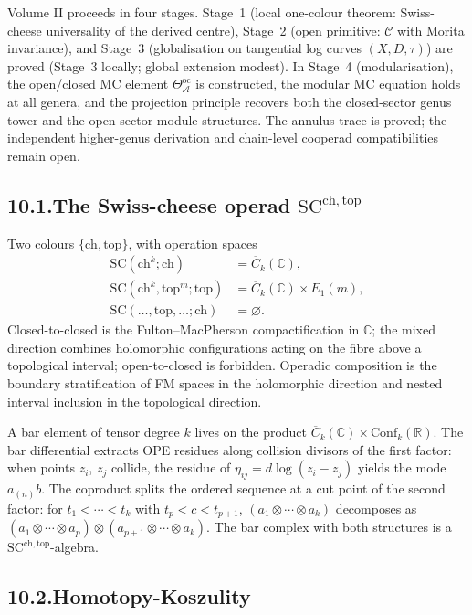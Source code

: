 \documentclass[11pt,reqno]{amsart}
\theoremstyle{definition}
\theoremstyle{remark}
\providecommand{\cA}{\mathcal{A}}
\providecommand{\cC}{\mathcal{C}}
\providecommand{\FM}{\overline{C}}
\providecommand{\bC}{\mathbb{C}}
\providecommand{\bR}{\mathbb{R}}
\providecommand{\SCchtop}{\mathrm{SC}^{\mathrm{ch,top}}}
\providecommand{\Conf}{\mathrm{Conf}}
\providecommand{\oc}{\mathrm{oc}}
\providecommand{\SC}{\mathrm{SC}}
\numberwithin{equation}{section}
\begin{document}
Volume II proceeds in four stages. Stage~1 (local one-colour
theorem: Swiss-cheese universality of the derived centre),
Stage~2 (open primitive: $\cC$ with Morita invariance), and
Stage~3 (globalisation on tangential log curves $(X, D, \tau)$)
are proved (Stage~3 locally; global extension modest). In Stage~4 (modularisation), the open/closed MC
element $\Theta^{\oc}_\cA$ is constructed, the modular MC
equation holds at all genera, and the projection principle
recovers both the closed-sector genus tower and the
open-sector module structures. The annulus trace is proved;
the independent higher-genus derivation and chain-level
cooperad compatibilities remain open.

\subsection*{10.1.\enspace The Swiss-cheese operad
$\SCchtop$}

Two colours $\{\mathrm{ch}, \mathrm{top}\}$, with operation
spaces
\begin{align*}
\SC(\mathrm{ch}^k; \mathrm{ch}) &= \FM_k(\bC),\\
\SC(\mathrm{ch}^k, \mathrm{top}^m; \mathrm{top})
&= \FM_k(\bC) \times E_1(m),\\
\SC(\ldots, \mathrm{top}, \ldots; \mathrm{ch}) &= \varnothing.
\end{align*}
Closed-to-closed is the Fulton--MacPherson compactification in
$\bC$; the mixed direction combines holomorphic configurations
acting on the fibre above a topological interval; open-to-closed
is forbidden. Operadic composition is the boundary stratification
of FM spaces in the holomorphic direction and nested interval
inclusion in the topological direction.

A bar element of tensor degree $k$ lives on the product
$\FM_k(\bC) \times \Conf_k(\bR)$. The bar differential extracts
OPE residues along collision divisors of the first factor: when
points $z_i$, $z_j$ collide, the residue of
$\eta_{ij} = d\log(z_i - z_j)$ yields the mode $a_{(n)}b$. The
coproduct splits the ordered sequence at a cut point of the
second factor: for $t_1 < \cdots < t_k$ with $t_p < c < t_{p+1}$,
$(a_1\otimes\cdots\otimes a_k)$ decomposes as
$(a_1\otimes\cdots\otimes a_p)\otimes(a_{p+1}\otimes\cdots\otimes a_k)$.
The bar complex with both structures is a
$\SCchtop$-algebra.

\subsection*{10.2.\enspace Homotopy-Koszulity}
\end{document}
